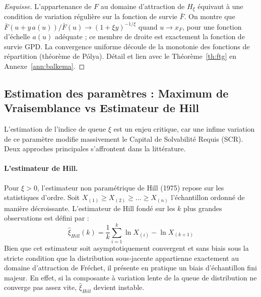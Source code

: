 \documentclass[11pt,a4paper]{article}
\theoremstyle{navystyle}
\theoremstyle{navydef}
\begin{document}
\begin{proof}[Esquisse]
L'appartenance de $F$ au domaine d'attraction de $H_\xi$ équivaut à une condition de variation régulière sur la fonction de survie $\bar F$. On montre que $\bar F(u+y\,a(u))/\bar F(u)\to(1+\xi y)^{-1/\xi}$ quand $u\to x_F$, pour une fonction d'échelle $a(u)$ adéquate ; ce membre de droite est exactement la fonction de survie GPD. La convergence uniforme découle de la monotonie des fonctions de répartition (théorème de Pólya). Détail et lien avec le Théorème~\ref{th:ftg} en Annexe~\ref{ann:balkema}.
\end{proof}

\subsection{Estimation des paramètres : Maximum de Vraisemblance vs Estimateur de Hill}

L'estimation de l'indice de queue $\xi$ est un enjeu critique, car une infime variation de ce paramètre modifie massivement le Capital de Solvabilité Requis (SCR). Deux approches principales s'affrontent dans la littérature.

\paragraph{L'estimateur de Hill.}
Pour $\xi > 0$, l'estimateur non paramétrique de Hill (1975) repose sur les statistiques d'ordre. Soit $X_{(1)} \ge X_{(2)} \ge \dots \ge X_{(n)}$ l'échantillon ordonné de manière décroissante. L'estimateur de Hill fondé sur les $k$ plus grandes observations est défini par :
\begin{equation}
\hat{\xi}_{Hill}(k) = \frac{1}{k} \sum_{i=1}^{k} \ln X_{(i)} - \ln X_{(k+1)}
\end{equation}
Bien que cet estimateur soit asymptotiquement convergent et sans biais sous la stricte condition que la distribution sous-jacente appartienne exactement au domaine d'attraction de Fréchet, il présente en pratique un biais d'échantillon fini majeur. En effet, si la composante à variation lente de la queue de distribution ne converge pas assez vite, $\hat{\xi}_{Hill}$ devient instable.
\end{document}
